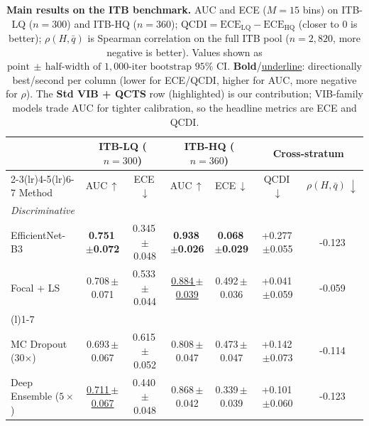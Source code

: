 \begin{table}[!tbp]
\centering
\caption{\textbf{Main results on the ITB benchmark.}
AUC and ECE ($M{=}15$ bins) on ITB-LQ ($n{=}300$) and ITB-HQ ($n{=}360$); $\text{QCDI}=\mathrm{ECE}_\mathrm{LQ}-\mathrm{ECE}_\mathrm{HQ}$ (closer to $0$ is better); $\rho(H,\bar q)$ is Spearman correlation on the full ITB pool ($n{=}2{,}820$, more negative is better). Values shown as $\text{point}\,{\scriptscriptstyle\pm}\,\text{half-width of $1{,}000$-iter bootstrap $95\%$ CI}$. \textbf{Bold}/\underline{underline}: directionally best/second per column (lower for ECE/QCDI, higher for AUC, more negative for $\rho$). The \textbf{Std VIB + QCTS} row (highlighted) is our contribution; VIB-family models trade AUC for tighter calibration, so the headline metrics are ECE and QCDI.}
\label{tab:main}
\vspace{4pt}
\footnotesize
\setlength{\tabcolsep}{4.5pt}
\renewcommand{\arraystretch}{1.05}
\begin{tabular}{l cc cc cc}
\toprule
& \multicolumn{2}{c}{\textbf{ITB-LQ} ($n{=}300$)}  & \multicolumn{2}{c}{\textbf{ITB-HQ} ($n{=}360$)}  & \multicolumn{2}{c}{\textbf{Cross-stratum}} \\
\cmidrule(lr){2-3}\cmidrule(lr){4-5}\cmidrule(lr){6-7}
Method & AUC\,$\uparrow$ & ECE\,$\downarrow$ & AUC\,$\uparrow$ & ECE\,$\downarrow$ & QCDI\,$\downarrow$ & $\rho(H,\bar q)\,\downarrow$ \\
\midrule
\multicolumn{7}{l}{\textit{Discriminative}} \\
EfficientNet-B3 & \textbf{0.751{\tiny\,$\pm$0.072}} & \cellcolor{red!11}0.345{\tiny\,$\pm$0.048} & \textbf{0.938{\tiny\,$\pm$0.026}} & \textbf{0.068{\tiny\,$\pm$0.029}} & \cellcolor{red!22}+0.277{\tiny\,$\pm$0.055} & \cellcolor{red!15}-0.123 \\
Focal + LS & 0.708{\tiny\,$\pm$0.071} & \cellcolor{red!19}0.533{\tiny\,$\pm$0.044} & \underline{0.884{\tiny\,$\pm$0.039}} & \cellcolor{red!22}0.492{\tiny\,$\pm$0.036} & \cellcolor{red!3}+0.041{\tiny\,$\pm$0.059} & \cellcolor{red!13}-0.059 \\
\addlinespace[2pt]\cmidrule(l){1-7}\addlinespace[2pt]
\multicolumn{7}{l}{\textit{Bayesian / ensemble}} \\
MC Dropout (30$\times$) & 0.693{\tiny\,$\pm$0.067} & \cellcolor{red!22}0.615{\tiny\,$\pm$0.052} & 0.808{\tiny\,$\pm$0.047} & \cellcolor{red!21}0.473{\tiny\,$\pm$0.047} & \cellcolor{red!11}+0.142{\tiny\,$\pm$0.073} & \cellcolor{red!15}-0.114 \\
Deep Ensemble ($5\times$) & \underline{0.711{\tiny\,$\pm$0.067}} & \cellcolor{red!15}0.440{\tiny\,$\pm$0.048} & 0.868{\tiny\,$\pm$0.042} & \cellcolor{red!14}0.339{\tiny\,$\pm$0.039} & \cellcolor{red!8}+0.101{\tiny\,$\pm$0.060} & \cellcolor{red!15}-0.123 \\

\end{tabular}
\end{table}
